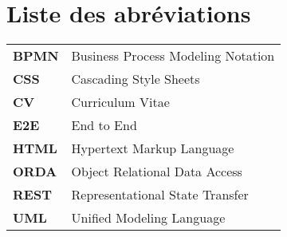 \chapter*{Liste des abréviations}

\begin{spacing}{1.5}
    
\begin{tabular}{l  l}    
    \textbf{BPMN} & Business Process Modeling Notation \\
    \textbf{CSS} & Cascading Style Sheets \\
    \textbf{CV} & Curriculum Vitae \\
    \textbf{E2E} & End to End \\
    \textbf{HTML} & Hypertext Markup Language \\ 
    \textbf{ORDA} & Object Relational Data Access \\
    \textbf{REST} & Representational State Transfer \\
    \textbf{UML} & Unified Modeling Language \\
    
\end{tabular}
\end{spacing}
